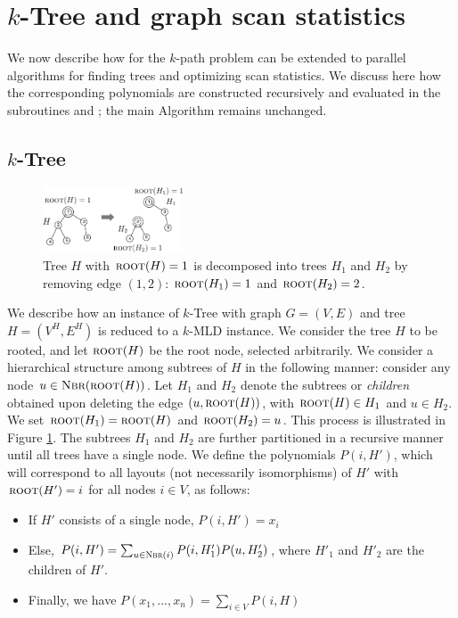 \section{$k$-Tree and graph scan statistics}
\label{sec:applications}
We now describe how \ouralgo{} for the $k$-path problem can be extended to 
parallel algorithms for finding trees and optimizing scan statistics. We discuss here how the corresponding polynomials are constructed recursively and evaluated in the subroutines \parcircuittree{} and \parcircuitscan{};
the main Algorithm \ouralgo{} remains unchanged.

\subsection{$k$-Tree}
\label{sec:apps-trees}
\begin{figure}[h]
\vspace{-0.2in}
\centering
\includegraphics[width=0.37\textwidth]{img/trees.pdf}
\caption{
\small
Tree $H$ with $\textsc{root}(H)=1$ is decomposed into trees $H_1$ and $H_2$ by
removing edge $(1, 2)$: $\textsc{root}(H_1)=1$ and $\textsc{root}(H_2)=2$.
}
\label{fig:trees}
\end{figure}
We describe how an instance of $k$-Tree with graph $G=(V,E)$ and tree $H=(V^H, E^H)$
is reduced to a $k$-MLD instance. We consider the tree $H$ to be rooted,
and let $\textsc{root}(H)$ be the root node, selected arbitrarily. We consider a hierarchical
structure among subtrees of $H$ in the following manner: consider any node $u\in\textsc{Nbr}(\textsc{root}(H))$.
Let $H_1$ and $H_2$ denote the subtrees or \emph{children} obtained upon deleting the edge $(u, \textsc{root}(H))$,
with $\textsc{root}(H)\in H_1$ and $u\in H_2$. We set $\textsc{root}(H_1)=\textsc{root}(H)$ and $\textsc{root}(H_2)=u$.
This process is illustrated in Figure \ref{fig:trees}.
The subtrees $H_1$ and $H_2$ are further partitioned in a recursive manner until
all trees have a single node.
We define the polynomials $P(i, H')$, which will correspond to all layouts (not necessarily
isomorphisms) of $H'$ with $\textsc{root}(H')=i$ for all nodes $i \in V$, as follows:
\begin{itemize}
\item
If $H'$ consists of a single node, $P(i, H') = x_i$
\item
Else, 
$P(i, H') = \sum_{u\in\textsc{Nbr}(i)} P(i, H'_1)P(u, H'_2)$, where
$H'_1$ and $H'_2$ are the children of $H'$.
\item
Finally, we have
$P(x_1,\ldots, x_n)= \sum_{i \in V} P(i, H)$
\end{itemize}


